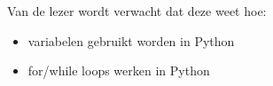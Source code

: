 Van de lezer wordt verwacht dat deze weet hoe:
\begin{itemize}
\item variabelen gebruikt worden in Python
\item for/while loops werken in Python
\end{itemize}

